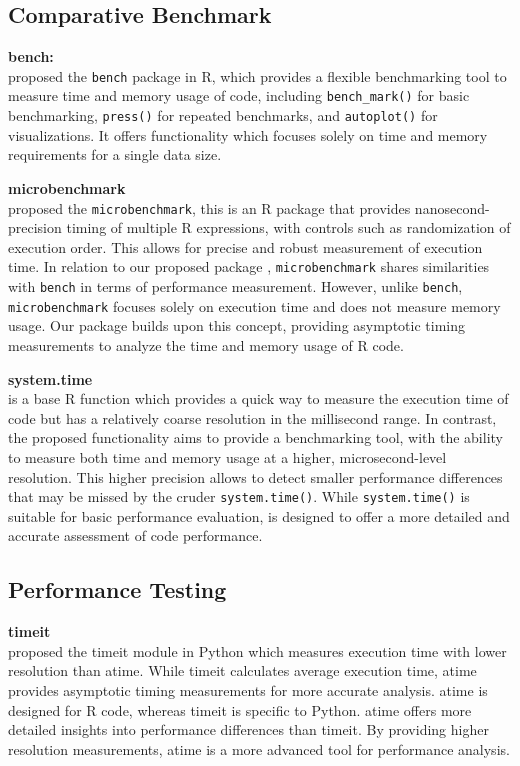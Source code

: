 \subsection{Comparative Benchmark}

\textbf{bench:} \\
\citet{bench} proposed the \texttt{bench} package in R, which provides a flexible benchmarking tool to measure time and memory usage of code, including \texttt{bench\_mark()} for basic benchmarking, \texttt{press()} for repeated benchmarks, and \texttt{autoplot()} for visualizations. It offers functionality which focuses solely on time and memory requirements for a single data size.
\vspace{0.1in}

\textbf{microbenchmark} \\
\citet{microbenchmark} proposed the \texttt{microbenchmark}, this is an R package that provides nanosecond-precision timing of multiple R expressions, with controls such as randomization of execution order. This allows for precise and robust measurement of execution time. In relation to our proposed package , \texttt{microbenchmark} shares similarities with \texttt{bench} in terms of performance measurement. However, unlike \texttt{bench}, \texttt{microbenchmark} focuses solely on execution time and does not measure memory usage. Our  package builds upon this concept, providing asymptotic timing measurements to analyze the time and memory usage of R code.
\vspace{0.1in}

\textbf{system.time} \\
\citet{system.time} is a base R function which provides a quick way to measure the execution time of code but has a relatively coarse resolution in the millisecond range. In contrast, the proposed  functionality aims to provide a benchmarking tool, with the ability to measure both time and memory usage at a higher, microsecond-level resolution. This higher precision allows  to detect smaller performance differences that may be missed by the cruder \texttt{system.time()}. While \texttt{system.time()} is suitable for basic performance evaluation,  is designed to offer a more detailed and accurate assessment of code performance.
\vspace{0.1in}


\subsection{Performance Testing}
\textbf{timeit} \\
\citet{timeit} proposed the timeit module in Python which measures execution time with lower resolution than atime. While timeit calculates average execution time, atime provides asymptotic timing measurements for more accurate analysis. atime is designed for R code, whereas timeit is specific to Python. atime offers more detailed insights into performance differences than timeit. By providing higher resolution measurements, atime is a more advanced tool for performance analysis.
\vspace{0.1in}


